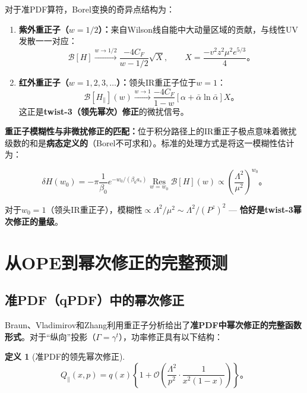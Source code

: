 \documentclass[12pt,a4paper]{ctexart}
\theoremstyle{definition}
\newtheorem{definition}{定义}[section]
\begin{document}
对于准PDF算符，Borel变换的奇异点结构为\cite{Braun2019power}：

\begin{enumerate}
    \item \textbf{紫外重正子（$w = 1/2$）：}来自Wilson线自能中大动量区域的贡献，与线性UV发散一一对应：
    \begin{equation}
    \mathcal{B}[H] \xrightarrow{w \to 1/2} \frac{-4C_F}{w - 1/2} \sqrt{X}, \qquad X = \frac{-v^2 z^2 \mu^2 e^{5/3}}{4}。
    \end{equation}

    \item \textbf{红外重正子（$w = 1, 2, 3, \ldots$）：}领头IR重正子位于$w = 1$：
    \begin{equation}
    \mathcal{B}[H_\parallel](w) \xrightarrow{w \to 1} \frac{-4C_F}{1-w} [\alpha + \bar{\alpha}\ln\bar{\alpha}] X。
    \label{eq:leading_IR_renormalon}
    \end{equation}
    这正是\textbf{twist-3（领先幂次）修正}的微扰信号。
\end{enumerate}

\textbf{重正子模糊性与非微扰修正的匹配：}位于积分路径上的IR重正子极点意味着微扰级数的和是\textbf{病态定义的}（Borel不可求和）。标准的处理方式是将这一模糊性估计为：

\begin{equation}
\delta H(w_0) = -\pi \frac{1}{\beta_0} e^{-w_0/(\beta_0 a_s)} \operatorname*{Res}_{w=w_0} \mathcal{B}[H](w) \propto \left(\frac{\Lambda^2}{\mu^2}\right)^{w_0}。
\label{eq:renormalon_ambiguity}
\end{equation}

对于$w_0 = 1$（领头IR重正子），模糊性$\propto \Lambda^2/\mu^2 \sim \Lambda^2/(P^z)^2$ — \textbf{恰好是twist-3幂次修正的量级}。

\section{从OPE到幂次修正的完整预测}

\subsection{准PDF（qPDF）中的幂次修正}

Braun、Vladimirov和Zhang\cite{Braun2019power}利用重正子分析给出了\textbf{准PDF中幂次修正的完整函数形式}。对于``纵向''投影（$\Gamma = \gamma^t$），功率修正具有以下结构\cite{Braun2019power}：

\begin{definition}[准PDF的领先幂次修正]
\begin{equation}
\boxed{Q_\parallel(x, p) = q(x) \left\{1 + \mathcal{O}\left(\frac{\Lambda^2}{p^2} \cdot \frac{1}{x^2(1-x)}\right)\right\}}。
\label{eq:power_correction_qPDF}
\end{equation}
\end{definition}
\end{document}

